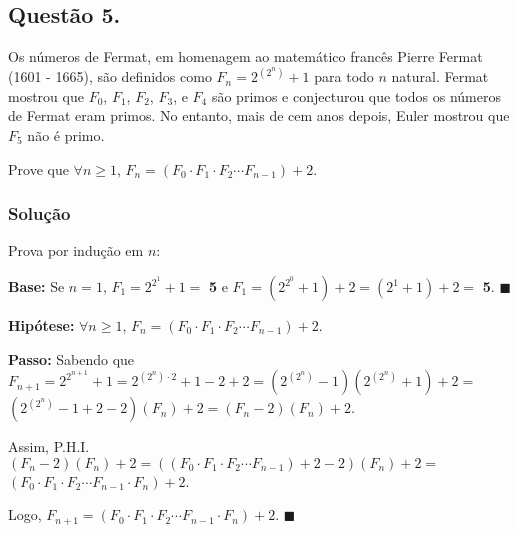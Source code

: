 \documentclass[12pt, letterpaper]{report}
\newcommand*{\CQD}{\hfill\ensuremath{\blacksquare}}%
\newcounter{ProblemNum}
\newcommand*{\anyproblem}[1]{\newpage\subsection*{#1}}
\newcommand*{\problem}[1]{\stepcounter{ProblemNum} %
   \anyproblem{Questão #1}}
\newcommand*{\soln}[1]{\subsubsection*{#1}}
\newcommand*{\solution}{\soln{Solução}}
\begin{document}
\problem{5.}
Os números de Fermat, em homenagem ao matemático francês Pierre Fermat (1601 - 1665), são definidos como $ F_n = 2^{(2^n)} + 1 $ para todo $ n $ natural. Fermat mostrou que $ F_0 $,  $ F_1 $, $ F_2 $, $ F_3 $, e $ F_4 $ são primos e conjecturou que todos os números de Fermat eram primos. No entanto, mais de cem anos depois, Euler mostrou que $ F_5 $ não é primo.

Prove que $ \forall n \ge 1 $,  $ F_n = (F_0 \cdot F_1 \cdot F_2 \cdots F_{n - 1}) + 2 $.

\solution
    Prova por indução em $n$:

    \textbf{Base:} Se $n = 1$, $F_1 = 2^{2^1} + 1 = $ \textbf{5} e $F_1 = (2^{2^0} + 1) + 2 = (2^1 + 1) + 2 = $ \textbf{5}. \CQD

    \textbf{Hipótese:} $ \forall n \ge 1 $,  $ F_n = (F_0 \cdot F_1 \cdot F_2 \cdots F_{n - 1}) + 2 $.

    \textbf{Passo:} Sabendo que $ F_{n + 1} = 2^{2^{n + 1}} + 1 = 2^{(2^n) \cdot 2} + 1 - 2 + 2= (2^{(2^n)} - 1)(2^{(2^n)} + 1) + 2 = $ \\
    $(2^{(2^n)} - 1 + 2 - 2)(F_n) + 2 = (F_n - 2)(F_n) + 2$. 

    Assim, P.H.I. $(F_n - 2)(F_n) + 2 = ((F_0 \cdot F_1 \cdot F_2 \cdots F_{n - 1}) + 2 - 2)(F_n) + 2 =$ \\
    $(F_0 \cdot F_1 \cdot F_2 \cdots F_{n - 1} \cdot F_n) + 2$.

    Logo, $ F_{n + 1} = (F_0 \cdot F_1 \cdot F_2 \cdots F_{n - 1} \cdot F_n) + 2$. \CQD
\end{document}
